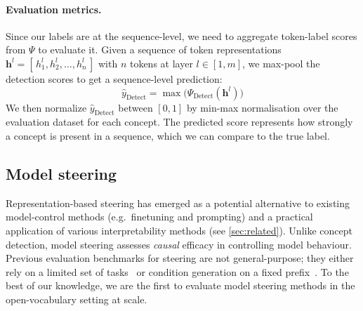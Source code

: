 \documentclass{article}
\theoremstyle{plain}
\theoremstyle{definition}
\theoremstyle{remark}
\renewcommand{\cite}{\citep}
\newcommand{\methodtag}[2]{%
  \tikz[baseline=(char.base)]{%
    \node[
      fill=#1,
      rounded corners=2pt,
      text=white,
      font=\bfseries,
      minimum width=1em,
      minimum height=1em,
      align=center,
      inner sep=0pt
    ](char){#2};%
  }%
}
\newcommand{\steeringtag}{\protect\methodtag{steeringcolor}{S}}
\begin{document}
\paragraph{Evaluation metrics.} Since our labels are at the sequence-level, we need to aggregate token-label scores from $\Psi$ to evaluate it. Given a sequence of token representations \(\mathbf{h}^{l} = [\,h_1^l, h_2^l, \ldots, h_n^l\,]\) with $n$ tokens at layer $l \in [1, m]$, we max-pool the detection scores to get a sequence-level prediction:
\begin{equation}\label{eq:maxpool-detect}
    \hat{y}_{\text{Detect}} = \max\bigl(\Psi_{\text{Detect}}(\mathbf{h}^l)\bigr)
\end{equation}
We then normalize $\hat{y}_{\text{Detect}}$ between $[0, 1]$ by min-max normalisation over the evaluation dataset for each concept. The predicted score represents how strongly a concept is present in a sequence, which we can compare to the true label.

\subsection{\steeringtag{} Model steering}\label{sec:model-steering}
Representation-based steering has emerged as a potential alternative to existing model-control methods (e.g.~finetuning and prompting) and a practical application of various interpretability methods (see \cref{sec:related}). Unlike concept detection, model steering assesses \textit{causal} efficacy in controlling model behaviour.
Previous evaluation benchmarks for steering are not general-purpose; they either rely on a limited set of tasks~\cite{zou2023representationengineeringtopdownapproach, makelov2024sparse,bhalla2025unifyinginterpretabilitycontrolevaluation} or condition generation on a fixed prefix~\cite{chalnev2024improvingsteeringvectorstargeting}.
To the best of our knowledge, we are the first to evaluate model steering methods in the open-vocabulary setting at scale. 
\end{document}
